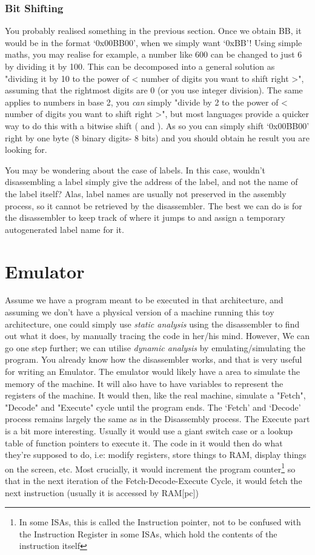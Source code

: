 \documentclass[twocolumn, a4paper,12pt]{article}
\begin{document}
\subsubsection{Bit Shifting}
You probably realised something in the previous section. Once we obtain BB, it would be in the format `0x00BB00', when we simply
want `0xBB'! Using simple maths, you may realise for example, a number like 600 can be changed to just 6 by dividing it by 100.
This can be decomposed into a general solution as "dividing it by 10 to the power of < number of digits you want to shift right >",
assuming that the rightmost digits are 0 (or you use integer division). The same applies to numbers in base 2, you \textit{can}
simply "divide by 2 to the power of < number of digits you want to shift right >", but most languages provide a quicker way to do
this with a bitwise shift ( \gg and \ll ). As so you can simply shift `0x00BB00' right by one byte (8 binary digits- 8 bits)
and you should obtain he result you are looking for.


You may be wondering about the case of labels. In this case, wouldn't disassembling a label simply give the address
of the label, and not the name of the label itself? Alas, label names are usually not preserved in the assembly process, so it cannot
be retrieved by the disassembler. The best we can do is for the disassembler to keep track of where it jumps to and assign
a temporary autogenerated label name for it.

\section{Emulator}
Assume we have a program meant to be executed in that architecture, and assuming we don't have 
a physical version of a machine running this toy architecture, one could simply use 
\textit{static analysis} using the disassembler to find out what it does, by manually tracing the code
in her/his mind.
However, We can go one step further; we can utilise \textit{dynamic analysis} by emulating/simulating 
the program.
You already know how the disassembler works, and that is very useful for writing an Emulator.
The emulator would likely have a area to simulate the memory of the machine. It will also have to 
have variables to represent the registers of the machine. It would then, like the real machine,
simulate a "Fetch", "Decode" and "Execute" cycle until the program ends. The `Fetch' and `Decode' process remains
largely the same as in the Disassembly process. The Execute part is a bit more interesting. Usually it would use a giant
switch case or a lookup table of function pointers to execute it. The code in it would then do what they're supposed to do, i.e:
modify registers, store things to RAM, display things on the screen, etc. Most crucially, it would increment the program counter\footnote{
In some ISAs, this is called the Instruction pointer, not to be confused with the Instruction Register in some ISAs, which hold the contents
of the instruction itself} so that in the next iteration of the Fetch-Decode-Execute Cycle, it would fetch the next instruction (usually
it is accessed by RAM[pc])
\end{document}
